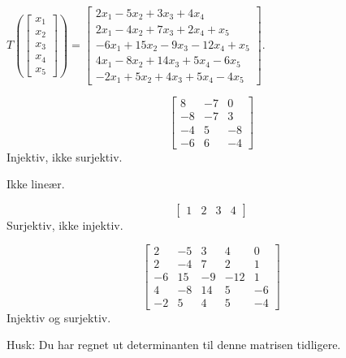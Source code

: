 \begin{oppgave}
\begin{punkt}
\end{punkt}

\begin{punkt}
$T(\begin{bmatrix}
x_1\\
x_2\\
x_3\\
x_4\\
x_5
\end{bmatrix})=\begin{bmatrix}
2x_1-5x_2+3x_3+4x_4\\
2x_1-4x_2+7x_3+2x_4+x_5\\
-6x_1+15x_2-9x_3-12x_4+x_5\\
4x_1-8x_2+14x_3+5x_4-6x_5\\
-2x_1+5x_2+4x_3+5x_4-4x_5
\end{bmatrix}.$

\end{punkt}


\end{oppgave}

\begin{losning}


\begin{punkt}
$$\begin{bmatrix}
8 & -7 & 0\\
-8 & -7 & 3\\
-4 & 5 & -8\\
-6 & 6 & -4
\end{bmatrix}$$
Injektiv, ikke surjektiv.
\end{punkt}

\begin{punkt}
Ikke lineær.
\end{punkt}

\begin{punkt}
$$\begin{bmatrix}
1 & 2 & 3 & 4
\end{bmatrix}$$
Surjektiv, ikke injektiv.
\end{punkt}

\begin{punkt}
$$
\begin{bmatrix}
2 & -5 & 3 & 4 & 0 \\
2 & -4 & 7 & 2 & 1 \\
-6 & 15 & -9 & -12 & 1 \\
4 & -8 & 14 & 5 & -6 \\
-2 & 5 & 4 & 5 & -4
\end{bmatrix}
$$
Injektiv og surjektiv.

\noindent 
Husk: Du har regnet ut determinanten til denne matrisen tidligere.

\end{punkt}

\end{losning}



